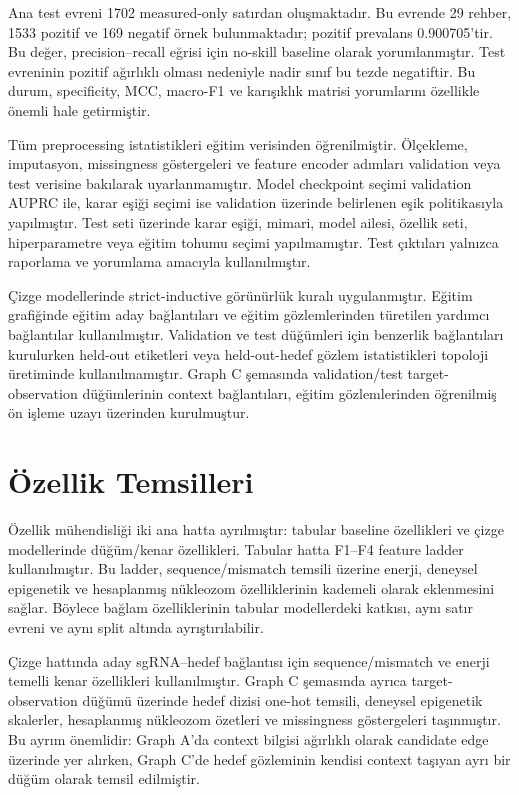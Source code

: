 Ana test evreni 1702 measured-only satırdan oluşmaktadır. Bu evrende 29 rehber, 1533 pozitif ve 169 negatif örnek bulunmaktadır; pozitif prevalans 0.900705'tir. Bu değer, precision--recall eğrisi için no-skill baseline olarak yorumlanmıştır. Test evreninin pozitif ağırlıklı olması nedeniyle nadir sınıf bu tezde negatiftir. Bu durum, specificity, MCC, macro-F1 ve karışıklık matrisi yorumlarını özellikle önemli hale getirmiştir.

Tüm preprocessing istatistikleri eğitim verisinden öğrenilmiştir. Ölçekleme, imputasyon, missingness göstergeleri ve feature encoder adımları validation veya test verisine bakılarak uyarlanmamıştır. Model checkpoint seçimi validation AUPRC ile, karar eşiği seçimi ise validation üzerinde belirlenen eşik politikasıyla yapılmıştır. Test seti üzerinde karar eşiği, mimari, model ailesi, özellik seti, hiperparametre veya eğitim tohumu seçimi yapılmamıştır. Test çıktıları yalnızca raporlama ve yorumlama amacıyla kullanılmıştır.

Çizge modellerinde strict-inductive görünürlük kuralı uygulanmıştır. Eğitim grafiğinde eğitim aday bağlantıları ve eğitim gözlemlerinden türetilen yardımcı bağlantılar kullanılmıştır. Validation ve test düğümleri için benzerlik bağlantıları kurulurken held-out etiketleri veya held-out-hedef gözlem istatistikleri topoloji üretiminde kullanılmamıştır. Graph C şemasında validation/test target-observation düğümlerinin context bağlantıları, eğitim gözlemlerinden öğrenilmiş ön işleme uzayı üzerinden kurulmuştur.

\section{Özellik Temsilleri}

Özellik mühendisliği iki ana hatta ayrılmıştır: tabular baseline özellikleri ve çizge modellerinde düğüm/kenar özellikleri. Tabular hatta F1--F4 feature ladder kullanılmıştır. Bu ladder, sequence/mismatch temsili üzerine enerji, deneysel epigenetik ve hesaplanmış nükleozom özelliklerinin kademeli olarak eklenmesini sağlar. Böylece bağlam özelliklerinin tabular modellerdeki katkısı, aynı satır evreni ve aynı split altında ayrıştırılabilir.

Çizge hattında aday sgRNA--hedef bağlantısı için sequence/mismatch ve enerji temelli kenar özellikleri kullanılmıştır. Graph C şemasında ayrıca target-observation düğümü üzerinde hedef dizisi one-hot temsili, deneysel epigenetik skalerler, hesaplanmış nükleozom özetleri ve missingness göstergeleri taşınmıştır. Bu ayrım önemlidir: Graph A'da context bilgisi ağırlıklı olarak candidate edge üzerinde yer alırken, Graph C'de hedef gözleminin kendisi context taşıyan ayrı bir düğüm olarak temsil edilmiştir.

